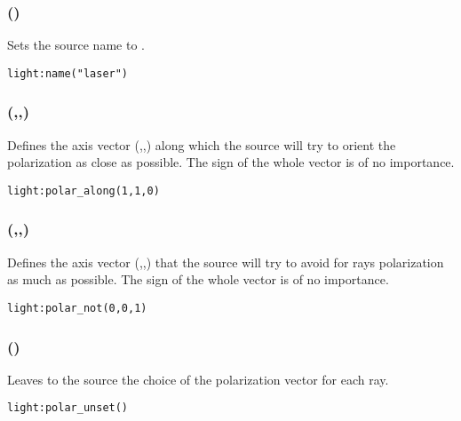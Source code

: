 \subsubsection[name]{()}

Sets the source name to .
\begin{lstlisting}
light:name("laser")
\end{lstlisting}

%

\subsubsection[polar\_along]{(,,)}

Defines the axis vector (,,) along which the source will try to orient the polarization as close as possible. The sign of the whole vector is of no importance.
\begin{lstlisting}
light:polar_along(1,1,0)
\end{lstlisting}

\subsubsection[polar\_not]{(,,)}

Defines the axis vector (,,) that the source will try to avoid for rays polarization as much as possible. The sign of the whole vector is of no importance.
\begin{lstlisting}
light:polar_not(0,0,1)
\end{lstlisting}

\subsubsection[polar\_unset]{()}

Leaves to the source the choice of the polarization vector for each ray.
\begin{lstlisting}
light:polar_unset()
\end{lstlisting}

